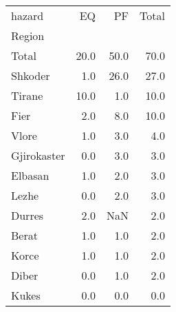 \begin{tabular}{lrrr}
\toprule
hazard &    EQ &    PF &  Total \\
Region      &       &       &        \\
\midrule
Total       &  20.0 &  50.0 &   70.0 \\
Shkoder     &   1.0 &  26.0 &   27.0 \\
Tirane      &  10.0 &   1.0 &   10.0 \\
Fier        &   2.0 &   8.0 &   10.0 \\
Vlore       &   1.0 &   3.0 &    4.0 \\
Gjirokaster &   0.0 &   3.0 &    3.0 \\
Elbasan     &   1.0 &   2.0 &    3.0 \\
Lezhe       &   0.0 &   2.0 &    3.0 \\
Durres      &   2.0 &   NaN &    2.0 \\
Berat       &   1.0 &   1.0 &    2.0 \\
Korce       &   1.0 &   1.0 &    2.0 \\
Diber       &   0.0 &   1.0 &    2.0 \\
Kukes       &   0.0 &   0.0 &    0.0 \\
\bottomrule
\end{tabular}
